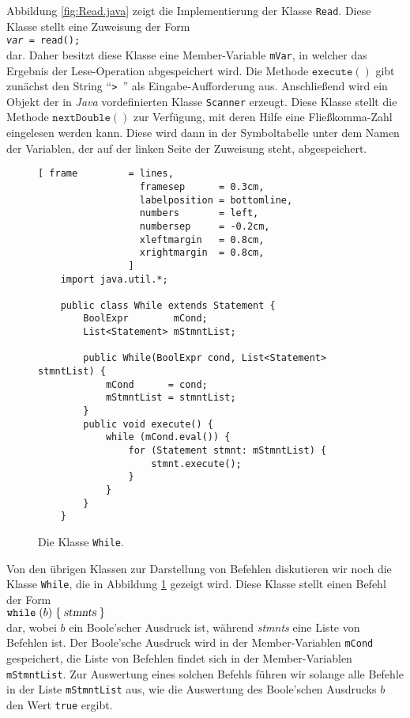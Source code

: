 Abbildung \ref{fig:Read.java} zeigt die Implementierung der Klasse \texttt{Read}.  Diese
 Klasse stellt  eine Zuweisung der Form
\\[0.2cm]
\hspace*{1.3cm} \texttt{\textsl{var} = read();}
\\[0.2cm]
dar.  Daher besitzt diese Klasse eine Member-Variable \texttt{mVar}, in welcher das Ergebnis
der Lese-Operation abgespeichert wird.  
Die Methode $\texttt{execute}()$ gibt zun\"achst den String ``\texttt{> }'' als
Eingabe-Aufforderung aus.  Anschlie{\ss}end wird ein Objekt der in \textsl{Java}
vordefinierten Klasse \texttt{Scanner} erzeugt.  Diese Klasse stellt die Methode
$\texttt{nextDouble}()$ zur Verf\"ugung, mit deren Hilfe eine Flie{\ss}komma-Zahl eingelesen
werden kann.  Diese wird dann in der Symboltabelle unter dem Namen der Variablen,
der auf der linken Seite der Zuweisung steht, abgespeichert.



\begin{figure}[!ht]
\centering
\begin{Verbatim}[ frame         = lines, 
                  framesep      = 0.3cm, 
                  labelposition = bottomline,
                  numbers       = left,
                  numbersep     = -0.2cm,
                  xleftmargin   = 0.8cm,
                  xrightmargin  = 0.8cm,
                ]
    import java.util.*;
    
    public class While extends Statement {
        BoolExpr        mCond;
        List<Statement> mStmntList;
        
        public While(BoolExpr cond, List<Statement> stmntList) {
            mCond      = cond;
            mStmntList = stmntList;
        }
        public void execute() {
            while (mCond.eval()) {
                for (Statement stmnt: mStmntList) {
                    stmnt.execute();
                }
            }
        }
    }
\end{Verbatim}
\vspace*{-0.3cm}
\caption{Die Klasse \texttt{While}.}
\label{fig:While.java}
\end{figure}




Von den \"ubrigen Klassen zur Darstellung von Befehlen diskutieren wir noch die Klasse
\texttt{While}, die in Abbildung \ref{fig:While.java} gezeigt wird.
Diese Klasse stellt einen Befehl der Form
\\[0.2cm]
\hspace*{1.3cm}
$\mathtt{while}\;(b)\; \{ \;\textsl{stmnts}\; \}$
\\[0.2cm]
dar, wobei $b$ ein Boole'scher Ausdruck ist, w\"ahrend \textsl{stmnts} eine Liste von Befehlen 
ist.  Der Boole'sche Ausdruck wird in der Member-Variablen \texttt{mCond} gespeichert, die Liste von
Befehlen findet sich in der Member-Variablen \texttt{mStmntList}.  Zur Auswertung eines solchen
Befehls f\"uhren wir solange alle Befehle in der Liste \texttt{mStmntList} aus, wie die Auswertung des
Boole'schen Ausdrucks $b$ den Wert \texttt{true} ergibt.


